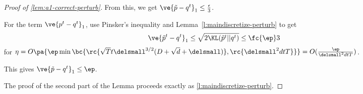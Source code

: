 \begin{proof}[Proof of \ref{lem:a1-correct-perturb}]
From this, we get $\ve{\tilde{p}-q^t}_1 \leq \frac{\epsilon}{3}$. 

For the term $\ve{p^t-q^t}_1$, use Pinsker's inequality and Lemma~\ref{l:maindiscretize-perturb} to get
\begin{align}
\ve{\tilde{p}^t-q^t}_1 \le \sqrt{2\KL(\tilde{p}^t||q^t)} \le \fc{\ep}3
\end{align}
for %
$\eta = O\pa{\ep \min\bc{\rc{\sqrt T t \delsmall^{3/2} (D+\sqrt d + \delsmall)}, \rc{\delsmall^2 dtT}}} = O(\frac{\ep}{\delsmall^2 dtT})$. 

This gives $\ve{\tilde{p}-q^t}_1 \le \ep$. 

The proof of the second part of the Lemma proceeds exactly as \ref{l:maindiscretize-perturb}.

\end{proof}  


